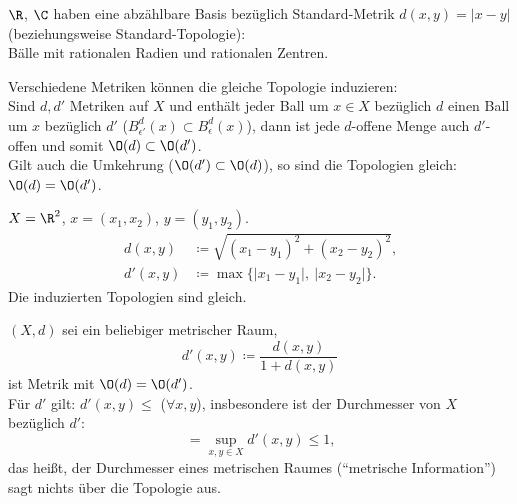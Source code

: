 \begin{example}
  \( \R \), \( \C \) haben eine abzählbare Basis bezüglich Standard-Metrik \( d(x,y) = \vert x - y \vert \) (beziehungsweise Standard-Topologie): \\
  Bälle mit rationalen Radien und rationalen Zentren.
\end{example}

\begin{remark}
  Verschiedene Metriken können die gleiche Topologie induzieren: \\
  Sind \( d, d' \) Metriken auf \( X \) und enthält jeder Ball um \( x \in X \) bezüglich \( d \) einen Ball um \( x \) bezüglich \( d' \) (\( B_{\epsilon'}^d(x) \subset B_\epsilon^d(x) \)), dann ist jede \( d \)-offene Menge auch \( d' \)-offen und somit \( \O(d) \subset \O(d') \). \\
  Gilt auch die Umkehrung (\( \O(d') \subset \O(d) \)), so sind die Topologien gleich: \( \O(d) = \O(d') \).
\end{remark}

\begin{example}
  \( X = \R^2 \), \( x = (x_1, x_2) \), \( y = (y_1, y_2) \).
  \begin{align*}
    d(x,y) &\coloneqq \sqrt{{(x_1-y_1)}^2+{(x_2-y_2)}^2}\text{,} \\
    d'(x,y) &\coloneqq \max \{ \vert x_1-y_1\vert, \ \vert x_2-y_2 \vert \}\text{.}
  \end{align*}
  Die induzierten Topologien sind gleich.
\end{example}

\begin{example}
  \( (X, d) \) sei ein beliebiger metrischer Raum,
  \begin{equation*}
    d'(x,y) \coloneqq \frac{d(x,y)}{1 + d(x,y)}
  \end{equation*}
  ist Metrik mit \( \O(d) = \O(d') \). \\
  Für \( d' \) gilt: \( d'(x,y) \leq \) (\( \forall x,y \)), insbesondere ist der Durchmesser von \( X \) bezüglich \( d' \):
  \begin{equation*}
    = \sup_{x,y \in X}d'(x,y) \leq 1\text{,}
  \end{equation*}
  das heißt, der Durchmesser eines metrischen Raumes (``metrische Information'') sagt nichts über die Topologie aus.
\end{example}

